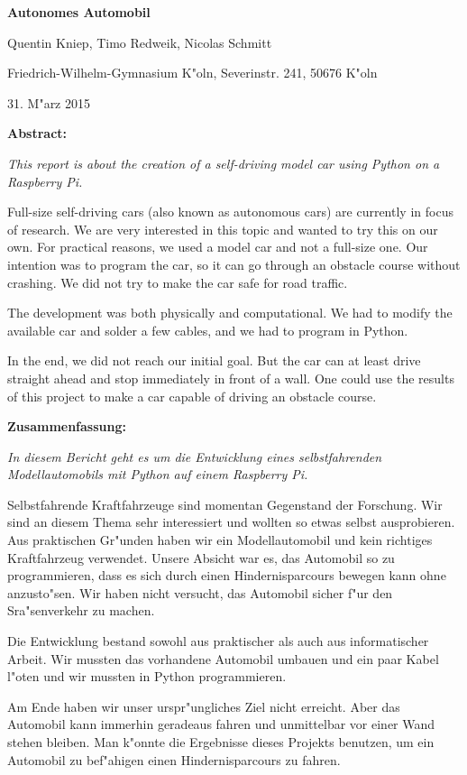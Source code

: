 \documentclass[a4paper,12pt]{article}
\begin{document}
{\Large\bf Autonomes Automobil}

\medskip

Quentin Kniep, Timo Redweik, Nicolas Schmitt

\medskip

Friedrich-Wilhelm-Gymnasium K"oln, Severinstr. 241, 50676 K"oln

\medskip

31. M"arz  2015

\medskip

{\bf  Abstract:}

{\small

	{\it This report is about the creation of a self-driving model car using Python on a Raspberry Pi.}
	
	Full-size self-driving cars (also known as autonomous cars) are currently in focus of research.
	We are very interested in this topic and wanted to try this on our own.
	For practical reasons, we used a model car and not a full-size one.
	Our intention was to program the car, so it can go through an obstacle course without crashing.
	We did not try to make the car safe for road traffic.

	The development was both physically and computational.
	We had to modify the available car and solder a few cables, and we had to program in Python.
	
	In the end, we did not reach our initial goal.
	But the car can at least drive straight ahead and stop immediately in front of a wall.
	One could use the results of this project to make a car capable of driving an obstacle 	course.

}

\medskip

{\bf  Zusammenfassung:}

{\small

	{\it In diesem Bericht geht es um die Entwicklung eines selbstfahrenden Modellautomobils mit Python auf einem Raspberry Pi.}
	
	Selbstfahrende Kraftfahrzeuge sind momentan Gegenstand der Forschung.
	Wir sind an diesem Thema sehr interessiert und wollten so etwas selbst ausprobieren.
	Aus praktischen Gr"unden haben wir ein Modellautomobil und kein richtiges Kraftfahrzeug verwendet.
	Unsere Absicht war es, das Automobil so zu programmieren, dass es sich durch einen Hindernisparcours bewegen kann ohne anzusto"sen.
	Wir haben nicht versucht, das Automobil sicher f"ur den Sra"senverkehr zu machen.
	
	Die Entwicklung bestand sowohl aus praktischer als auch aus informatischer Arbeit.
	Wir mussten das vorhandene Automobil umbauen und ein paar Kabel l"oten und wir mussten in Python programmieren.
	
	Am Ende haben wir unser urspr"ungliches Ziel nicht erreicht.
	Aber das Automobil kann immerhin geradeaus fahren und unmittelbar vor einer Wand stehen bleiben.
	Man k"onnte die Ergebnisse dieses Projekts benutzen, um ein Automobil zu bef"ahigen einen Hindernisparcours zu fahren.

}
\end{document}
